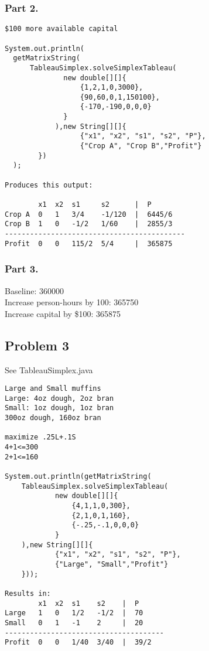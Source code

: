 \documentclass[11pt,a4paper,openany]{report}
\begin{document}
\subsubsection{Part 2.}
\begin{verbatim}
$100 more available capital

System.out.println(
  getMatrixString(
      TableauSimplex.solveSimplexTableau(
              new double[][]{
                  {1,2,1,0,3000},
                  {90,60,0,1,150100},
                  {-170,-190,0,0,0}
              }
            ),new String[][]{
                  {"x1", "x2", "s1", "s2", "P"},
                  {"Crop A", "Crop B","Profit"}
        })
  );

Produces this output:

        x1  x2  s1     s2      |  P
Crop A  0   1   3/4    -1/120  |  6445/6
Crop B  1   0   -1/2   1/60    |  2855/3
-------------------------------------------
Profit  0   0   115/2  5/4     |  365875
\end{verbatim}

\subsubsection{Part 3.}
Baseline:                     360000\\
Increase person-hours by 100: 365750\\
Increase capital by \$100:    365875\\



\subsection{Problem 3}
See TableauSimplex.java
\begin{verbatim}
Large and Small muffins
Large: 4oz dough, 2oz bran
Small: 1oz dough, 1oz bran
300oz dough, 160oz bran

maximize .25L+.1S
4+1<=300
2+1<=160

System.out.println(getMatrixString(
    TableauSimplex.solveSimplexTableau(
            new double[][]{
                {4,1,1,0,300},
                {2,1,0,1,160},
                {-.25,-.1,0,0,0}
            }
    ),new String[][]{
            {"x1", "x2", "s1", "s2", "P"},
            {"Large", "Small","Profit"}
    }));

Results in:
        x1  x2  s1    s2    |  P
Large   1   0   1/2   -1/2  |  70
Small   0   1   -1    2     |  20
--------------------------------------
Profit  0   0   1/40  3/40  |  39/2
\end{verbatim}
\end{document}
